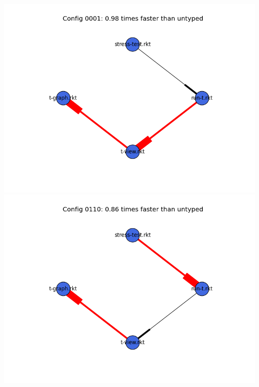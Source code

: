 \documentclass{article}
\begin{document}
\begin{itemize}
\includegraphics[width=\textwidth]{mbta-base-module-graph-0001.png}
\includegraphics[width=\textwidth]{mbta-base-module-graph-0110.png}
\end{itemize}
\end{document}
